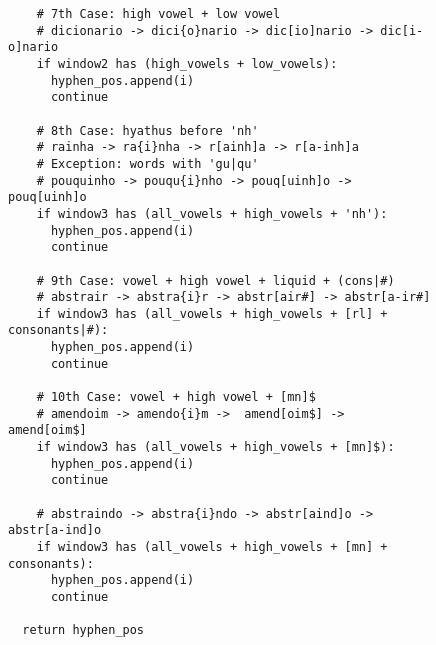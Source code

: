 \begin{figure}[!ht]
\begin{verbatim}
    # 7th Case: high vowel + low vowel
    # dicionario -> dici{o}nario -> dic[io]nario -> dic[i-o]nario 
    if window2 has (high_vowels + low_vowels):
      hyphen_pos.append(i)
      continue
    
    # 8th Case: hyathus before 'nh'
    # rainha -> ra{i}nha -> r[ainh]a -> r[a-inh]a
    # Exception: words with 'gu|qu'
    # pouquinho -> pouqu{i}nho -> pouq[uinh]o -> pouq[uinh]o
    if window3 has (all_vowels + high_vowels + 'nh'):
      hyphen_pos.append(i)
      continue

    # 9th Case: vowel + high vowel + liquid + (cons|#)
    # abstrair -> abstra{i}r -> abstr[air#] -> abstr[a-ir#]
    if window3 has (all_vowels + high_vowels + [rl] + consonants|#):
      hyphen_pos.append(i)
      continue
    
    # 10th Case: vowel + high vowel + [mn]$
    # amendoim -> amendo{i}m ->  amend[oim$] ->  amend[oim$]    
    if window3 has (all_vowels + high_vowels + [mn]$):
      hyphen_pos.append(i)
      continue
    
    # abstraindo -> abstra{i}ndo -> abstr[aind]o -> abstr[a-ind]o 
    if window3 has (all_vowels + high_vowels + [mn] + consonants):
      hyphen_pos.append(i)
      continue
    
  return hyphen_pos
\end{verbatim}
\end{figure}